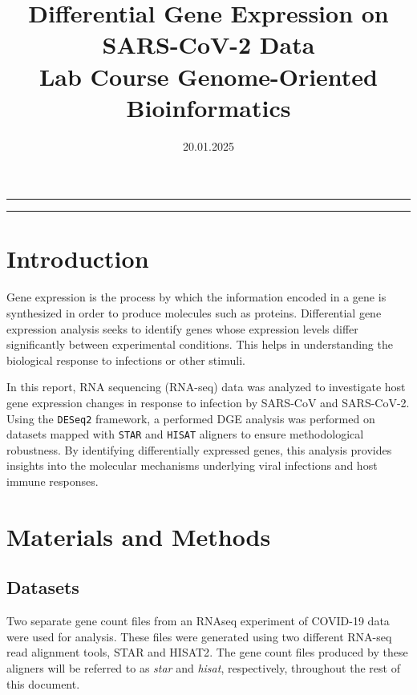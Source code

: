 \documentclass{article}
\title{Differential Gene Expression on SARS-CoV-2 Data\\\large Lab Course Genome-Oriented Bioinformatics}
\author{}
\date{20.01.2025}
\begin{document}
    \maketitle
    \renewcommand{\abstractname}{}
    \begin{abstract}
        \large
    \end{abstract}
    \hrule
    \tableofcontents
    \vspace{10pt} %
    \hrule


    \section{Introduction}\label{sec:introduction}
    Gene expression is the process by which the information encoded in a gene is synthesized in order to produce molecules such as proteins. Differential gene expression analysis seeks to identify genes whose expression levels differ significantly between experimental conditions. This helps in understanding the biological response to infections or other stimuli.

    In this report, RNA sequencing (RNA-seq) data was analyzed to investigate host gene expression changes in response to infection by SARS-CoV and SARS-CoV-2. Using the \texttt{DESeq2}\cite{love_huber_anders_2014} framework, a performed DGE analysis was performed on datasets mapped with \texttt{STAR}\cite{dobin_davis_schlesinger_drenkow_zaleski_jha_batut_chaisson_gingeras_2012} and \texttt{HISAT} \cite{kim2015hisat} aligners to ensure methodological robustness. By identifying differentially expressed genes, this analysis provides insights into the molecular mechanisms underlying viral infections and host immune responses.


    \section{Materials and Methods}\label{sec:materials-and-methods}

    \subsection{Datasets} \label{subsec:datasets}

    Two separate gene count files from an RNAseq experiment of COVID-19 data were used for analysis. These files were generated using two different RNA-seq read alignment tools, STAR\cite{dobin_davis_schlesinger_drenkow_zaleski_jha_batut_chaisson_gingeras_2012} and HISAT2\cite{kim_paggi_park_bennett_salzberg_2019}. The gene count files produced by these aligners will be referred to as \textit{star} and \textit{hisat}, respectively, throughout the rest of this document.
\end{document}
